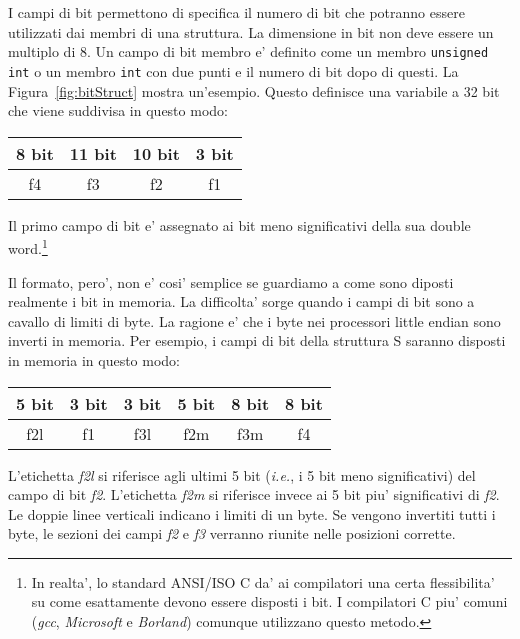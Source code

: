 I campi di bit permettono di specifica il numero di bit che potranno essere
utilizzati dai membri di una struttura. La dimensione in bit non deve essere
un multiplo di 8. Un campo di bit membro e' definito come un membro \lstinline|unsigned int| 
o un membro \lstinline|int| con due punti e il numero di bit dopo di questi. La 
Figura~\ref{fig:bitStruct} mostra un'esempio. Questo definisce una variabile
a 32 bit che viene suddivisa in questo modo: 
\begin{center}
\begin{tabular}{|c|c|c|c|}
\multicolumn{1}{c}{8 bit} & \multicolumn{1}{c}{11 bit} 
& \multicolumn{1}{c}{10 bit} & \multicolumn{1}{c}{3 bit} \\ \hline
\hspace{2em} f4 \hspace{2em} & \hspace{3em} f3 \hspace{3em}
& \hspace{3em} f2 \hspace{3em} & f1 \\
\hline
\end{tabular}
\end{center}
Il primo campo di bit e' assegnato ai bit meno significativi della
sua double word.\footnote{In realta', lo standard ANSI/ISO C da'
ai compilatori una certa flessibilita' su come esattamente devono
essere disposti i bit. I compilatori C piu' comuni (\emph{gcc}, \emph{Microsoft}
e \emph{Borland}) comunque utilizzano questo metodo.}

Il formato, pero', non e' cosi' semplice se guardiamo a come sono
diposti realmente i bit in memoria. La difficolta' sorge quando
i campi di bit sono a cavallo di limiti di byte. La ragione e' che i byte
nei processori little endian sono inverti in memoria. Per esempio, i campi
di bit della struttura {\code S} saranno disposti in memoria in questo
modo:
\begin{center}
\begin{tabular}{|c|c||c|c||c||c|}
\multicolumn{1}{c}{5 bit} & \multicolumn{1}{c}{3 bit} 
& \multicolumn{1}{c}{3 bit} & \multicolumn{1}{c}{5 bit} 
& \multicolumn{1}{c}{8 bit} & \multicolumn{1}{c}{8 bit} \\ \hline
f2l & f1 &  f3l  & f2m & \hspace{1em} f3m \hspace{1em} 
& \hspace{1.5em} f4 \hspace{1.5em} \\
\hline
\end{tabular}
\end{center}
L'etichetta \emph{f2l} si riferisce agli ultimi 5 bit (\emph{i.e.}, i 5 bit
meno significativi) del campo di bit \emph{f2}. L'etichetta \emph{f2m} si 
riferisce invece ai 5 bit piu' significativi di \emph{f2}. Le doppie linee
verticali indicano i limiti di un byte. Se vengono invertiti tutti i byte, le
sezioni dei campi \emph{f2} e \emph{f3} verranno riunite nelle posizioni
corrette. 

